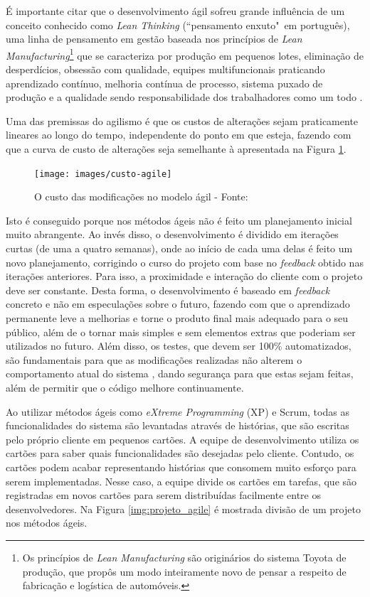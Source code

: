 É importante citar que o desenvolvimento ágil sofreu grande influência de um conceito conhecido como \textit{Lean Thinking} (``pensamento enxuto"\ em português), uma linha de pensamento em gestão baseada nos princípios de \textit{Lean Manufacturing}\footnote{Os princípios de \textit{Lean Manufacturing} são originários do sistema Toyota de produção, que propôs um modo inteiramente novo de pensar a respeito de fabricação e logística de automóveis.} que se caracteriza por produção em pequenos lotes, eliminação de desperdícios, obsessão com qualidade, equipes multifuncionais praticando aprendizado contínuo, melhoria contínua de processo, sistema puxado de produção e a qualidade sendo responsabilidade dos trabalhadores como um todo \cite{BDDRodrigo}.

Uma das premissas do agilismo é que os custos de alterações sejam praticamente lineares ao longo do tempo, independente do ponto em que esteja, fazendo com que a curva de custo de alterações seja semelhante à apresentada na Figura \ref{img:custo-agile}.

\begin{figure}[h]
  \center
  \caption{O custo das modificações no modelo ágil - Fonte: \cite{XPKent}}
  \texttt{[image: images/custo-agile]}
  \label{img:custo-agile}
\end{figure}

Isto é conseguido porque nos métodos ágeis não é feito um planejamento inicial muito abrangente. Ao invés disso, o desenvolvimento é dividido em iterações curtas (de uma a quatro semanas), onde ao início de cada uma delas é feito um novo planejamento, corrigindo o curso do projeto com base no \textit{feedback} obtido nas iterações anteriores. Para isso, a proximidade e interação do cliente com o projeto deve ser constante. Desta forma, o desenvolvimento é baseado em \textit{feedback} concreto e não em especulações sobre o futuro, fazendo com que o aprendizado permanente leve a melhorias e torne o produto final mais adequado para o seu público, além de o tornar mais simples e sem elementos extras que poderiam ser utilizados no futuro. Além disso, os testes, que devem ser 100\% automatizados, são fundamentais para que as modificações realizadas não alterem o comportamento atual do sistema  \cite{XPKent}, dando segurança para que estas sejam feitas, além de permitir que o código melhore continuamente.

Ao utilizar métodos ágeis como \textit{eXtreme Programming} (XP)  e Scrum, todas as funcionalidades do sistema são levantadas através de histórias, que são escritas pelo próprio cliente em pequenos cartões. A equipe de desenvolvimento utiliza os cartões para saber quais funcionalidades são desejadas pelo cliente. Contudo, os cartões podem acabar representando histórias que consomem muito esforço para serem implementadas. Nesse caso, a equipe divide os cartões em tarefas, que são registradas em novos cartões para serem distribuídas facilmente entre os desenvolvedores. Na Figura \ref{img:projeto_agile} é mostrada divisão de um projeto nos métodos ágeis.

